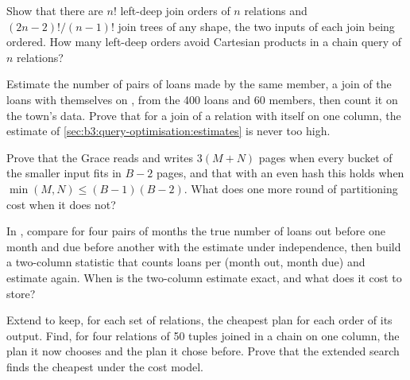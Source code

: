 \begin{exercise}[$\star\star$]\label{exo:b3:query-optimisation:8}
Show that there are $n!$ left-deep join orders of $n$ relations and $(2n - 2)!/(n - 1)!$ join trees of any shape, the two inputs of each join being ordered. How many left-deep orders avoid Cartesian products in a chain query of $n$ relations?
\end{exercise}

\begin{exercise}[$\star\star$]\label{exo:b3:query-optimisation:9}
Estimate the number of pairs of loans made by the same member, a join of the loans with themselves on , from the 400 loans and 60 members, then count it on the town's data. Prove that for a join of a relation with itself on one column, the estimate of \cref{sec:b3:query-optimisation:estimates} is never too high.
\end{exercise}

\begin{exercise}[$\star\star\star$]\label{exo:b3:query-optimisation:10}
Prove that the Grace  reads and writes $3(M + N)$ pages when every bucket of the smaller input fits in $B - 2$ pages, and that with an even hash this holds when $\min(M, N) \le (B-1)(B-2)$. What does one more round of partitioning cost when it does not?
\end{exercise}

\begin{exercise}[$\star\star\star$]\label{exo:b3:query-optimisation:11}
In , compare for four pairs of months the true number of loans out before one month and due before another with the estimate under independence, then build a two-column statistic that counts loans per (month out, month due) and estimate again. When is the two-column estimate exact, and what does it cost to store?
\end{exercise}

\begin{exercise}[$\star\star\star$]\label{exo:b3:query-optimisation:12}
Extend  to keep, for each set of relations, the cheapest plan for each order of its output. Find, for four relations of 50 tuples joined in a chain on one column, the plan it now chooses and the plan it chose before. Prove that the extended search finds the cheapest  under the cost model.
\end{exercise}

